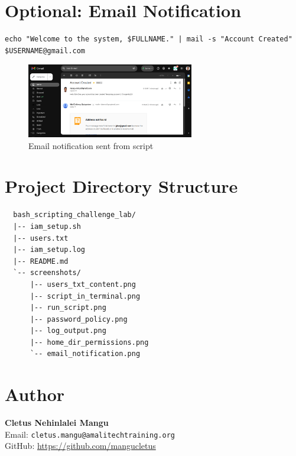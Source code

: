 \documentclass[a4paper,11pt]{article}
\begin{document}
\section*{Optional: Email Notification}

\begin{lstlisting}
echo "Welcome to the system, $FULLNAME." | mail -s "Account Created" $USERNAME@gmail.com
\end{lstlisting}

\begin{figure}[h!]
  \centering
  \includegraphics[width=0.65\textwidth]{screenshots/email_notification.png}
  \caption{Email notification sent from script}
\end{figure}

\section*{Project Directory Structure}
\begin{lstlisting}
  bash_scripting_challenge_lab/
  |-- iam_setup.sh
  |-- users.txt
  |-- iam_setup.log
  |-- README.md
  `-- screenshots/
      |-- users_txt_content.png
      |-- script_in_terminal.png
      |-- run_script.png
      |-- password_policy.png
      |-- log_output.png
      |-- home_dir_permissions.png
      `-- email_notification.png
  \end{lstlisting}
  
  


\section*{Author}
\textbf{Cletus Nehinlalei Mangu} \\
Email: \texttt{cletus.mangu@amalitechtraining.org} \\
GitHub: \url{https://github.com/mangucletus}
\end{document}
